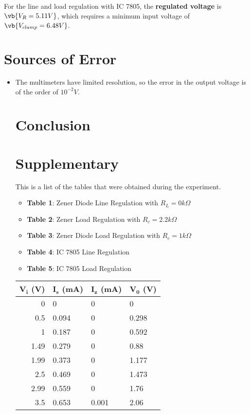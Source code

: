 \documentclass{scrartcl}
\newcommand{\1}{\mathbbm{1}}
\begin{document}
For the line and load regulation with IC 7805, the \textbf{regulated voltage} is $\vb{V_R = 5.11V}$, which 
requires a minimum input voltage of $\vb{V_{clamp} = 6.48V}$.
\section{Sources of Error}
\begin{itemize}
	\item The multimeters have limited resolution, so the error in the output voltage is of the order of $10^{-2}V$.
\section{Conclusion}
\newpage
\section{Supplementary}
This is a list of the tables that were obtained during the experiment.
\begin{itemize}
	\item \textbf{Table 1}: Zener Diode Line Regulation with $R_L = 0 k\Omega$
	\item \textbf{Table 2}: Zener Load Regulation with $R_c = 2.2 k\Omega$
	\item \textbf{Table 3}: Zener Diode Load Regulation with $R_c = 1 k\Omega$
	\item \textbf{Table 4}: IC 7805 Line Regulation
	\item \textbf{Table 5}: IC 7805 Load Regulation
\end{itemize}
\begin{table}[!ht]
    \centering
    \begin{tabular}{|r|l|l|l|}
    \hline
         \textbf{$\pmb{V_i}$ (V)} & \textbf{$\pmb{I_s}$ (mA)} & \textbf{$\pmb{I_z}$ (mA)} 
		& \textbf{$\pmb{V_0}$ (V)} \\ \hline
         0 & 0 & 0 & 0 \\ \hline
         0.5 & 0.094 & 0 & 0.298 \\ \hline
         1 & 0.187 & 0 & 0.592 \\ \hline
         1.49 & 0.279 & 0 & 0.88 \\ \hline
         1.99 & 0.373 & 0 & 1.177 \\ \hline
         2.5 & 0.469 & 0 & 1.473 \\ \hline
         2.99 & 0.559 & 0 & 1.76 \\ \hline
         3.5 & 0.653 & 0.001 & 2.06 \\ \hline

\end{tabular}
\end{table}
\end{itemize}
\end{document}
